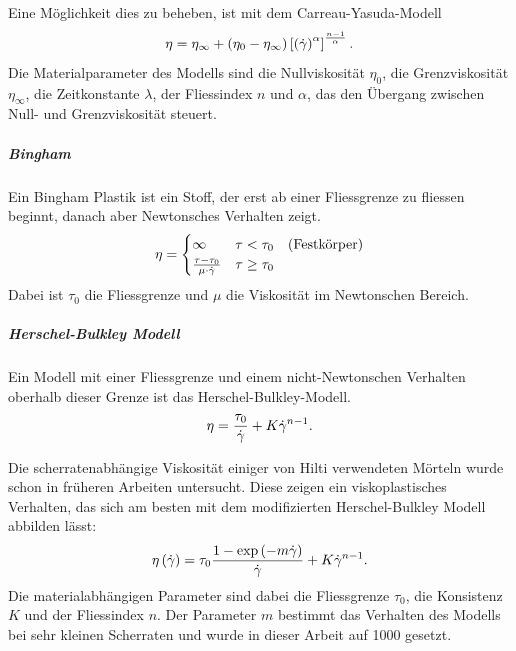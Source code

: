Eine Möglichkeit dies zu beheben, ist mit dem Carreau-Yasuda-Modell
\begin{equation}
    \eta=\eta_\infty+\left( \eta_0-\eta_\infty \right)\left[ \left( \dot\gamma \right)^\alpha \right] ^{\frac{n-1}{\alpha}}.
    \label{eq:fg:carreauyasuda}
\end{equation}
Die Materialparameter des Modells sind die Nullviskosität $\eta_0$, die Grenzviskosität $\eta_\infty$, die Zeitkonstante $\lambda$, der Fliessindex $n$ und $\alpha$, das den Übergang zwischen Null- und Grenzviskosität steuert.
%
\subparagraph{Bingham}
Ein Bingham Plastik ist ein Stoff, der erst ab einer Fliessgrenze zu fliessen beginnt, danach aber Newtonsches Verhalten zeigt.
\begin{equation}
    \eta=
    \begin{cases}
        \infty                           & \tau<\tau_{0}    \quad \text{(Festkörper)}\\
        \frac{\tau-\tau_{0}}{\mu\cdot\dot\gamma} & \tau\geq\tau_{0}
    \end{cases}
    \label{eq:fg:bingham}
\end{equation}
Dabei ist $\tau_0$ die Fliessgrenze und $\mu$ die Viskosität im Newtonschen Bereich.
%
\subparagraph{Herschel-Bulkley Modell}
Ein Modell mit einer Fliessgrenze und einem nicht-Newtonschen Verhalten oberhalb dieser Grenze ist das Herschel-Bulkley-Modell.
\begin{equation}
    \eta=  \frac{\tau_0}{\dot\gamma}+K\dot\gamma^{n-1}.
    \label{eq:fg:herschelbulkley}
\end{equation}

Die scherratenabhängige Viskosität einiger von Hilti verwendeten Mörteln wurde schon in früheren Arbeiten untersucht. Diese zeigen ein viskoplastisches Verhalten, das sich am besten mit dem modifizierten Herschel-Bulkley Modell abbilden lässt:
\begin{equation}
    \label{eq:modHB}
    \eta\left( \dot\gamma \right) = \tau_0 \frac{1-\exp \left( -m\dot\gamma \right)}{\dot\gamma}+K\dot\gamma^{n-1}.
\end{equation}
Die materialabhängigen Parameter sind dabei die Fliessgrenze $\tau_0$, die Konsistenz $K$ und der Fliessindex $n$. Der Parameter $m$ bestimmt das Verhalten des Modells bei sehr kleinen Scherraten und wurde in dieser Arbeit auf 1000 gesetzt.%
%
